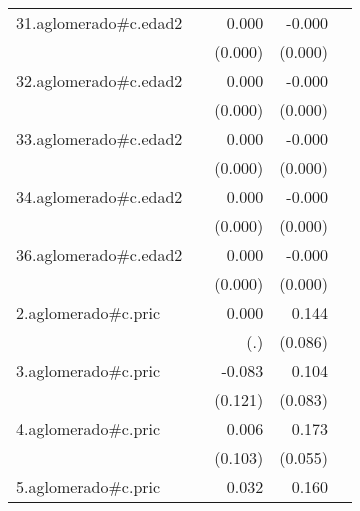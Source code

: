 {\begin{longtable}{l*{4}{D{.}{.}{-1}}}
\addlinespace
31.aglomerado#c.edad2&                     &       0.000         &      -0.000\sym{**} &                     \\
            &                     &     (0.000)         &     (0.000)         &                     \\
\addlinespace
32.aglomerado#c.edad2&                     &       0.000         &      -0.000\sym{***}&                     \\
            &                     &     (0.000)         &     (0.000)         &                     \\
\addlinespace
33.aglomerado#c.edad2&                     &       0.000\sym{***}&      -0.000\sym{***}&                     \\
            &                     &     (0.000)         &     (0.000)         &                     \\
\addlinespace
34.aglomerado#c.edad2&                     &       0.000\sym{**} &      -0.000         &                     \\
            &                     &     (0.000)         &     (0.000)         &                     \\
\addlinespace
36.aglomerado#c.edad2&                     &       0.000         &      -0.000\sym{*}  &                     \\
            &                     &     (0.000)         &     (0.000)         &                     \\
\addlinespace
2.aglomerado#c.pric&                     &       0.000         &       0.144         &                     \\
            &                     &         (.)         &     (0.086)         &                     \\
\addlinespace
3.aglomerado#c.pric&                     &      -0.083         &       0.104         &                     \\
            &                     &     (0.121)         &     (0.083)         &                     \\
\addlinespace
4.aglomerado#c.pric&                     &       0.006         &       0.173\sym{**} &                     \\
            &                     &     (0.103)         &     (0.055)         &                     \\
\addlinespace
5.aglomerado#c.pric&                     &       0.032         &       0.160\sym{*}  &                     \\

\end{longtable}}
